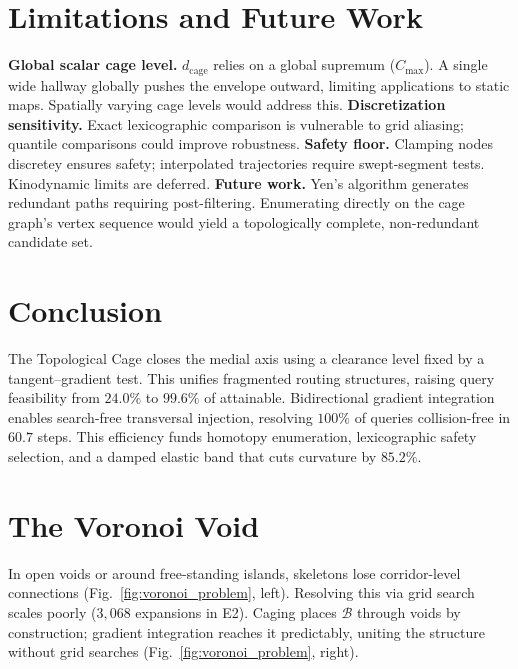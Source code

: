 \documentclass[conference]{IEEEtran}
\begin{document}
\section{Limitations and Future Work}
\label{sec:limitations}

\textbf{Global scalar cage level.} $d_{\mathrm{cage}}$ relies on a global supremum ($C_{\max}$). A single wide hallway globally pushes the envelope outward, limiting applications to static maps. Spatially varying cage levels would address this.
\textbf{Discretization sensitivity.} Exact lexicographic comparison is vulnerable to grid aliasing; quantile comparisons could improve robustness.
\textbf{Safety floor.} Clamping nodes discretey ensures safety; interpolated trajectories require swept-segment tests. Kinodynamic limits are deferred.
\textbf{Future work.} Yen's algorithm generates redundant paths requiring post-filtering. Enumerating directly on the cage graph's vertex sequence would yield a topologically complete, non-redundant candidate set.

\section{Conclusion}

The Topological Cage closes the medial axis using a clearance level fixed by a tangent--gradient test. This unifies fragmented routing structures, raising query feasibility from $24.0\%$ to $99.6\%$ of attainable. Bidirectional gradient integration enables search-free transversal injection, resolving $100\%$ of queries collision-free in $60.7$ steps. This efficiency funds homotopy enumeration, lexicographic safety selection, and a damped elastic band that cuts curvature by $85.2\%$. 

\appendices
\section{The Voronoi Void}
\label{appendix:voronoi_void}

In open voids or around free-standing islands, skeletons lose corridor-level connections (Fig.~\ref{fig:voronoi_problem}, left). Resolving this via grid search scales poorly ($3{,}068$ expansions in E2). Caging places $\mathcal{B}$ through voids by construction; gradient integration reaches it predictably, uniting the structure without grid searches (Fig.~\ref{fig:voronoi_problem}, right).
\end{document}
